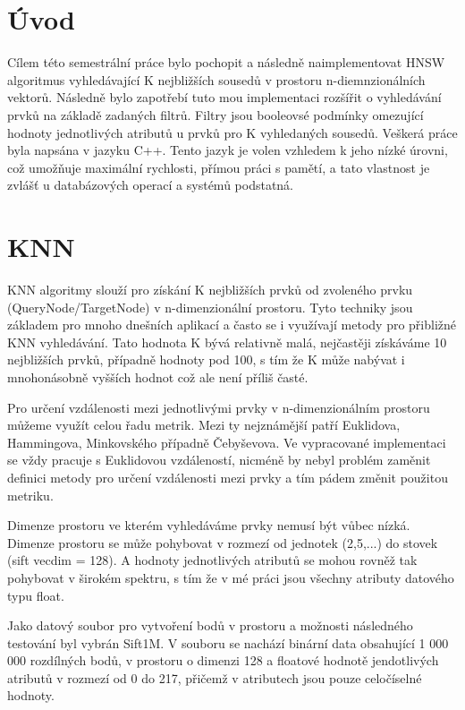 \documentclass[czech,semestral,dept460,male,csharp,cpdeclaration]{diploma}
\begin{document}
	
	\MakeTitlePages
	
	\chapter{Úvod}
	
		Cílem této semestrální práce bylo pochopit a následně naimplementovat HNSW algoritmus vyhledávající K nejbližších sousedů v prostoru n-diemnzionálních vektorů. Následně bylo zapotřebí tuto mou implementaci rozšířit o vyhledávání prvků na základě zadaných filtrů. Filtry jsou booleovsé podmínky omezující hodnoty jednotlivých atributů u prvků pro K vyhledaných sousedů. Veškerá práce byla napsána v jazyku C++. Tento jazyk je volen vzhledem k jeho nízké úrovni, což umožňuje maximální rychlosti, přímou práci s pamětí, a tato vlastnost je zvlášť u databázových operací a systémů podstatná.
	
	\chapter{KNN}
	
		KNN algoritmy slouží pro získání K nejbližších prvků od zvoleného prvku (QueryNode/TargetNode) v n-dimenzionální prostoru. Tyto techniky jsou základem pro mnoho dnešních aplikací a často se i využívají metody pro přibližné KNN vyhledávání. Tato hodnota K bývá relativně malá, nejčastěji získáváme 10 nejbližších prvků, případně hodnoty pod 100, s tím že K může nabývat i mnohonásobně vyšších hodnot což ale není příliš časté.
		
		Pro určení vzdálenosti mezi jednotlivými prvky v n-dimenzionálním prostoru můžeme využít celou řadu metrik. Mezi ty nejznámější patří Euklidova, Hammingova, Minkovského případně Čebyševova. Ve vypracované implementaci se vždy pracuje s Euklidovou vzdáleností, nicméně by nebyl problém zaměnit definici metody pro určení vzdálenosti mezi prvky a tím pádem změnit použitou metriku.
		
		Dimenze prostoru ve kterém vyhledáváme prvky nemusí být vůbec nízká. Dimenze prostoru se může pohybovat v rozmezí od jednotek (2,5,...) do stovek (sift vecdim = 128). A hodnoty jednotlivých atributů se mohou rovněž tak pohybovat v širokém spektru, s tím že v mé práci jsou všechny atributy datového typu float.
		
		Jako datový soubor pro vytvoření bodů v prostoru a možnosti následného testování byl vybrán Sift1M. V souboru se nachází binární data obsahující 1 000 000 rozdílných bodů, v prostoru o dimenzi 128 a floatové hodnotě jendotlivých atributů v rozmezí od 0 do 217, přičemž v atributech jsou pouze celočíselné hodnoty.
	
\end{document}
